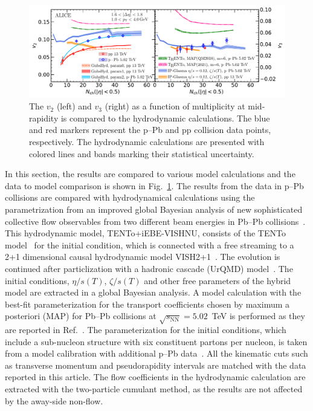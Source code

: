 \begin{figure}[h!]
	\centering
	\includegraphics[width=1.0\textwidth]{figures/Fig6_v2Mult_allSystems_Hydro.pdf} 
	\caption{The $v_2$ (left) and $v_3$ (right) as a function of multiplicity at mid-rapidity is compared to the hydrodynamic calculations. The blue and red markers represent the p--Pb and pp collision data points, respectively. The hydrodynamic calculations are presented with colored lines and bands marking their statistical uncertainty.} 
	\label{fig:vnmult_model}
\end{figure}

In this section, the results are compared to various model calculations and the data to model comparison is shown in Fig.~\ref{fig:vnmult_model}.
The results from the data in p--Pb collisions are compared with hydrodynamical calculations using the parametrization from an improved global
Bayesian analysis of new sophisticated collective flow observables
 from two different beam energies in Pb--Pb collisions~\cite{Parkkila:2021yha}. This hydrodynamic model, {TENTo}+iEBE-VISHNU, consists of the {TENTo} model~\cite{Moreland:2014oya} for the initial condition, which is connected with a free streaming to a 2+1 dimensional causal hydrodynamic model VISH2+1~\cite{Shen:2014vra}. The evolution is continued after particlization with a hadronic cascade (UrQMD) model~\cite{Bass:1998ca,Bleicher:1999xi}. The initial conditions, $\eta/s(T)$, $\zeta/s(T)$ and other free parameters of the hybrid model are extracted in a global Bayesian analysis.
A model calculation with the best-fit parameterization for the transport coefficients chosen by maximum a posteriori (MAP) for Pb--Pb collisions at $\sqrt{s_{\text{NN}}}=5.02$~TeV is performed as they are reported in Ref.~\cite{Parkkila:2021yha}. The parameterization for the initial conditions, which include a sub-nucleon structure with six constituent partons per nucleon, is taken from a model calibration with additional p--Pb data~\cite{Moreland:2018gsh}. All the kinematic cuts such as transverse momentum and pseudorapidity intervals are matched with the data reported in this article. The flow coefficients in the hydrodynamic calculation are extracted with the two-particle cumulant method, as the results are not affected by the away-side non-flow.

